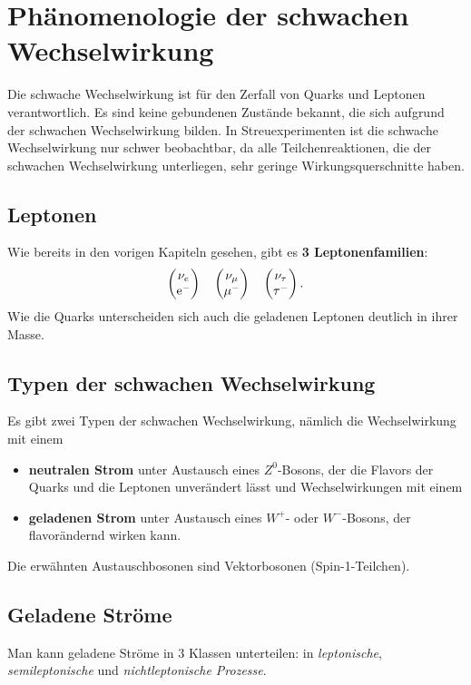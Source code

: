 \chapter{Phänomenologie der schwachen Wechselwirkung}
Die schwache Wechselwirkung ist für den Zerfall von Quarks und Leptonen verantwortlich.
Es sind keine gebundenen Zustände bekannt, die sich aufgrund der schwachen Wechselwirkung bilden.
In Streuexperimenten ist die schwache Wechselwirkung nur schwer beobachtbar, da alle Teilchenreaktionen, die der schwachen Wechselwirkung unterliegen, sehr geringe Wirkungsquerschnitte haben.

\section{Leptonen}
Wie bereits in den vorigen Kapiteln gesehen, gibt es \textbf{3 Leptonenfamilien}:
\begin{equation*}
	\begin{pmatrix} \nu_e \\ \text{e}^- \end{pmatrix}\quad\begin{pmatrix} \nu_\mu \\ \mu^- \end{pmatrix}\quad\begin{pmatrix} \nu_\tau \\ \tau^- \end{pmatrix}.
\end{equation*}
Wie die Quarks unterscheiden sich auch die geladenen Leptonen deutlich in ihrer Masse.

\section{Typen der schwachen Wechselwirkung}
Es gibt zwei Typen der schwachen Wechselwirkung, nämlich die Wechselwirkung mit einem
\begin{itemize}
	\item \textbf{neutralen Strom} unter Austausch eines $Z^0$-Bosons, der die Flavors der Quarks und die Leptonen unverändert lässt und Wechselwirkungen mit einem
	\item \textbf{geladenen Strom} unter Austausch eines $W^+$- oder $W^-$-Bosons, der flavorändernd wirken kann.
\end{itemize}

Die erwähnten Austauschbosonen sind Vektorbosonen (Spin-1-Teilchen).

\section{Geladene Ströme}
Man kann geladene Ströme in 3 Klassen unterteilen: in \textit{leptonische}, \textit{semileptonische} und \textit{nichtleptonische Prozesse}.
